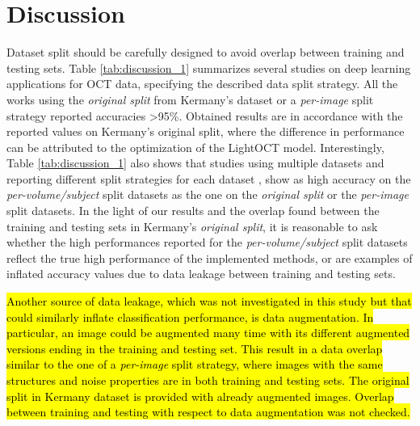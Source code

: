 \documentclass[fleqn,10pt]{wlscirep}
\begin{document}
\section*{Discussion}
Dataset split should be carefully designed to avoid overlap between training and testing sets. Table \ref{tab:discussion_1} summarizes several studies on deep learning applications for OCT data, specifying the described data split strategy. All the works using the \textit{original split} from Kermany’s dataset or a \textit{per-image} split strategy reported accuracies >95\%. Obtained results are in accordance with the reported values on Kermany’s original split, where the difference in performance can be attributed to the optimization of the LightOCT model. Interestingly, Table \ref{tab:discussion_1} also shows that studies using multiple datasets and reporting different split strategies for each dataset \cite{butola2020deep,kamran2019optic, thomas2021novel}, show as high accuracy on the \mbox{\textit{per-volume/subject}} split datasets as the one on the \textit{original split} or the \textit{per-image} split datasets. In the light of our results and the overlap found between the training and testing sets in Kermany’s \textit{original split}, it is reasonable to ask whether the high performances reported for the \textit{per-volume/subject} split datasets reflect the true high performance of the implemented methods, or are examples of inflated accuracy values due to data leakage between training and testing sets. 

\hl{Another source of data leakage, which was not investigated in this study but that could similarly inflate classification performance, is data augmentation.  In particular, an image could be augmented many time with its different augmented versions ending in the training and testing set.  This result in a data overlap similar to the one of a \textit{per-image} split strategy, where images with the same structures and noise properties are in both training and testing sets. The original split in Kermany dataset is provided with already augmented images. Overlap between training and testing with respect to data augmentation was not checked. }
\end{document}
